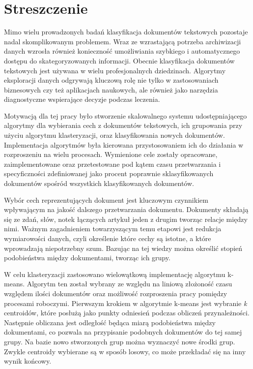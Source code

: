 \chapter*{Streszczenie}

Mimo wielu prowadzonych badań klasyfikacja dokumentów tekstowych pozostaje nadal skomplikowanym problemem. Wraz ze wzrastającą potrzeba archiwizacji danych wzrosła również konieczność umożliwiania szybkiego i automatycznego dostępu do skategoryzowanych informacji. Obecnie klasyfikacja dokumentów tekstowych jest używana w wielu profesjonalnych dziedzinach. Algorytmy eksploracji danych odgrywają kluczową rolę nie tylko w zastosowaniach biznesowych czy też aplikacjach naukowych, ale również jako narzędzia diagnostyczne wspierające decyzje podczas leczenia.

Motywacją dla tej pracy było stworzenie skalowalnego systemu udostępniającego algorytmy dla wybierania cech z dokumentów tekstowych, ich grupowania przy użyciu algorytmu klasteryzacji, oraz klasyfikowania nowych dokumentów. Implementacja algorytmów była kierowana przystosowaniem ich do działania w rozproszeniu na wielu procesach. Wymienione cele zostały opracowane, zaimplementowane oraz przetestowane pod kątem czasu przetwarzania i specyficzności zdefiniowanej jako procent poprawnie sklasyfikowanych dokumentów spośród wszystkich klasyfikowanych dokumentów.

Wybór cech reprezentujących dokument jest kluczowym czynnikiem wpływającym na jakość dalszego przetwarzania dokumentu. Dokumenty składają się ze zdań, słów, notek łączących artykuł jeden z drugim tworząc relacje między nimi. Ważnym zagadnieniem towarzyszącym temu etapowi jest redukcja wymiarowości danych, czyli określenie które cechy są istotne, a które wprowadzają niepotrzebny szum. Bazując na tej wiedzy można określić stopień podobieństwa między dokumentami, tworząc ich grupy.

W celu klasteryzacji zastosowano wielowątkową implementację algorytmu k-means. Algorytm ten został wybrany ze względu na liniową złożoność czasu względem ilości dokumentów oraz możliwość rozproszenia pracy pomiędzy procesami roboczymi. Pierwszym krokiem w algorytmie k-means jest wybranie \textit{k} centroidów, które posłużą jako punkty odniesień podczas obliczeń przynależności. Następnie obliczana jest odległość będąca miarą podobieństwa między dokumentami, co pozwala na przypisanie podobnych dokumentów do tej samej grupy. Na bazie nowo stworzonych grup można wyznaczyć nowe środki grup. Zwykle centroidy wybierane są w sposób losowy, co może przekładać się na inny wynik końcowy.

